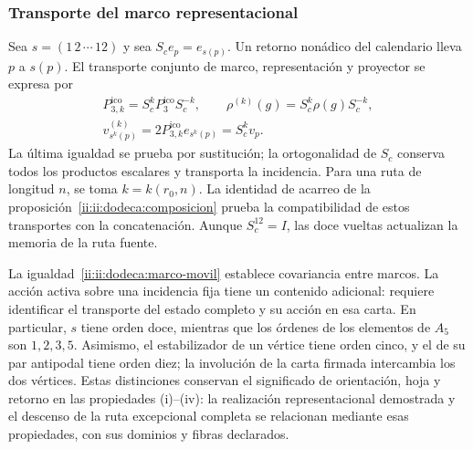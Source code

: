 \subsubsection{Transporte del marco representacional}
\label{ii:ii:dodeca:marco}
Sea \(s=(1\,2\,\cdots\,12)\) y sea \(S_ce_p=e_{s(p)}\).
Un retorno nonádico del calendario lleva \(p\) a \(s(p)\). El transporte
conjunto de marco, representación y proyector se expresa por
\begin{equation}
 \begin{gathered}
 P_{3,k}^{\mathrm{ico}}=S_c^kP_3^{\mathrm{ico}}S_c^{-k},\qquad
 \rho^{(k)}(g)=S_c^k\rho(g)S_c^{-k},\\
 v^{(k)}_{s^k(p)}=2P_{3,k}^{\mathrm{ico}}e_{s^k(p)}=S_c^kv_p.
 \end{gathered}
 \label{ii:ii:dodeca:marco-movil}
\end{equation}
La última igualdad se prueba por sustitución; la ortogonalidad de
\(S_c\) conserva todos los productos escalares y transporta la
incidencia. Para una ruta de longitud \(n\), se toma
\(k=k(r_0,n)\). La identidad de acarreo de la
proposición~\ref{ii:ii:dodeca:composicion} prueba la compatibilidad de
estos transportes con la concatenación. Aunque \(S_c^{12}=I\),
las doce vueltas actualizan la memoria de la ruta fuente.

La igualdad~\eqref{ii:ii:dodeca:marco-movil} establece covariancia entre
marcos. La acción activa sobre una incidencia fija tiene un contenido
adicional: requiere identificar el transporte del estado completo y su
acción en esa carta. En particular, \(s\) tiene orden doce, mientras
que los órdenes de los elementos de \(A_5\) son \(1,2,3,5\).
Asimismo, el estabilizador de un vértice tiene orden cinco, y el de su
par antipodal tiene orden diez; la involución de la carta firmada
intercambia los dos vértices. Estas distinciones conservan el significado
de orientación, hoja y retorno en las propiedades (i)--(iv): la
realización representacional demostrada y el descenso de la ruta
excepcional completa se relacionan mediante esas propiedades, con sus
dominios y fibras declarados.




